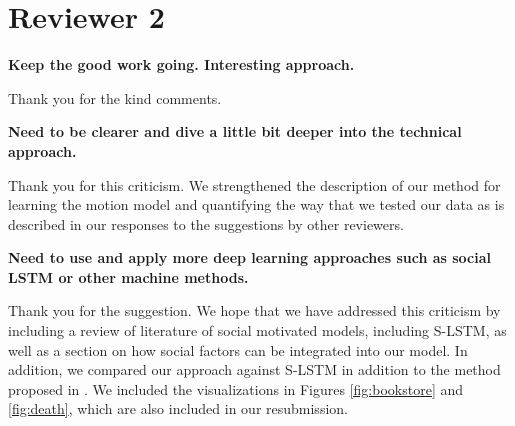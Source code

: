 \documentclass[usenames,dvipsnames]{article}
\begin{document}
\section*{Reviewer 2}
\begin{enumerate}
\begin{item}
\textbf{Keep the good work going. Interesting approach.}
\end{item}

Thank you for the kind comments.

\begin{item}
\textbf{
Need to be clearer and
dive a little bit deeper into the technical approach. }

Thank you for this criticism. 
We strengthened the description of our method for learning the motion model and quantifying the way that we tested our data as is described in our responses to the suggestions by other reviewers.

\end{item}


\begin{item}
\textbf{
Need to use and apply more deep learning approaches such as social LSTM
or other machine methods.}

Thank you for the suggestion. 
We hope that we have addressed this criticism by including a review of literature of social motivated models, including S-LSTM, as well as a section on how social factors can be integrated into our model. 
In addition, we compared our approach against S-LSTM in addition to the method proposed in \cite{Kitani2012}. 
We included the visualizations in Figures \ref{fig:bookstore} and \ref{fig:death}, which are also included in our resubmission.


\end{item}
\end{enumerate}
\end{document}
